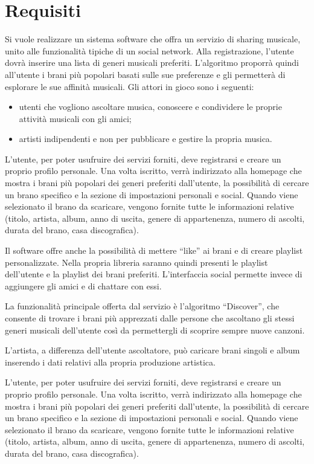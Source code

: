 \section{Requisiti}

Si vuole realizzare un sistema software che offra un servizio di sharing musicale, unito
alle funzionalità tipiche di un social network. Alla registrazione, l'utente dovrà
inserire una lista di generi musicali preferiti. L'algoritmo proporrà quindi all'utente i
brani più popolari basati sulle sue preferenze e gli permetterà di esplorare le sue
affinità musicali. Gli attori in gioco sono i seguenti:
\begin{itemize}
      \item utenti che vogliono ascoltare musica, conoscere e condividere le proprie
            attività musicali con gli amici;
      \item artisti indipendenti e non per pubblicare e gestire la propria musica.
\end{itemize}

L'utente, per poter usufruire dei servizi forniti, deve registrarsi e creare un proprio
profilo personale. Una volta iscritto, verrà indirizzato alla homepage che mostra i brani
più popolari dei generi preferiti dall'utente, la possibilità di cercare un brano
specifico e la sezione di impostazioni personali e social. Quando viene selezionato il
brano da scaricare, vengono fornite tutte le informazioni relative (titolo, artista,
album, anno di uscita, genere di appartenenza, numero di ascolti, durata del brano, casa
discografica).

Il software offre anche la possibilità di mettere ``like'' ai brani e di creare playlist
personalizzate. Nella propria libreria saranno quindi presenti le playlist dell'utente e
la playlist dei brani preferiti. L'interfaccia social permette invece di aggiungere gli
amici e di chattare con essi.

La funzionalità principale offerta dal servizio è l'algoritmo ``Discover'', che consente
di trovare i brani più apprezzati dalle persone che ascoltano gli stessi generi musicali
dell'utente così da permettergli di scoprire sempre nuove canzoni.

L'artista, a differenza dell'utente ascoltatore, può caricare brani singoli e album
inserendo i dati relativi alla propria produzione artistica.

L'utente, per poter usufruire dei servizi forniti, deve registrarsi e creare un proprio
profilo personale. Una volta iscritto, verrà indirizzato alla homepage che mostra i brani
più popolari dei generi preferiti dall'utente, la possibilità di cercare un brano
specifico e la sezione di impostazioni personali e social. Quando viene selezionato il
brano da scaricare, vengono fornite tutte le informazioni relative (titolo, artista,
album, anno di uscita, genere di appartenenza, numero di ascolti, durata del brano, casa
discografica).

